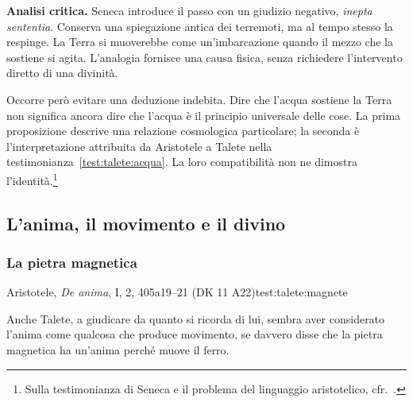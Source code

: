 
\noindent\textbf{Analisi critica.}
Seneca introduce il passo con un giudizio negativo, \emph{inepta sententia}. Conserva una spiegazione antica dei terremoti, ma al tempo stesso la respinge. La Terra si muoverebbe come un'imbarcazione quando il mezzo che la sostiene si agita. L'analogia fornisce una causa fisica, senza richiedere l'intervento diretto di una divinità.

Occorre però evitare una deduzione indebita. Dire che l'acqua sostiene la Terra non significa ancora dire che l'acqua è il principio universale delle cose. La prima proposizione descrive una relazione cosmologica particolare; la seconda è l'interpretazione attribuita da Aristotele a Talete nella testimonianza~\ref{test:talete:acqua}. La loro compatibilità non ne dimostra l'identità.\footnote{Sulla testimonianza di Seneca e il problema del linguaggio aristotelico, cfr.\ \cite[19]{palumbo2015}.}

\subsection{L'anima, il movimento e il divino}

\subsubsection{La pietra magnetica}

\begin{testimonianza}{Aristotele, \emph{De anima}, I, 2, 405a19--21 (DK 11 A22)}{test:talete:magnete}
\smallskip
{}\par
Anche Talete, a giudicare da quanto si ricorda di lui, sembra aver considerato l'anima come qualcosa che produce movimento, se davvero disse che la pietra magnetica ha un'anima perché muove il ferro.
\end{testimonianza}


